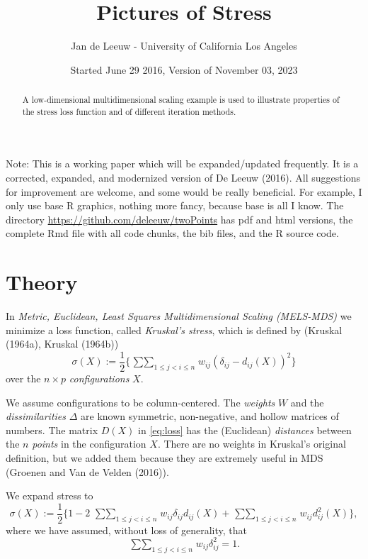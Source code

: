 \documentclass[
  12pt,
]{article}
\title{Pictures of Stress}
\author{Jan de Leeuw - University of California Los Angeles}
\date{Started June 29 2016, Version of November 03, 2023}
\newcommand{\jis}{\mathop{\sum\sum}_{1\leq j<i\leq n}}
\begin{document}
\maketitle
\begin{abstract}
A low-dimensional multidimensional scaling example is used to illustrate properties of the stress loss function and of different iteration methods.
\end{abstract}

{
\setcounter{tocdepth}{3}
\tableofcontents
}
Note: This is a working paper which will be expanded/updated frequently. It is a corrected, expanded, and modernized version of De Leeuw (2016). All suggestions for improvement are welcome, and some would be really beneficial. For example, I only use base R graphics, nothing more fancy, because base is all I know. The directory \url{https://github.com/deleeuw/twoPoints} has pdf and html versions, the complete Rmd file with all code chunks, the bib files, and the R source code.

\section{Theory}\label{theory}

In \emph{Metric, Euclidean, Least Squares Multidimensional Scaling (MELS-MDS)} we minimize a loss function, called \emph{Kruskal's stress}, which is defined by (Kruskal (1964a), Kruskal (1964b))
\begin{equation}
\sigma(X):=\frac12\{\jis w_{ij}(\delta_{ij}-d_{ij}(X))^2\}
\label{eq:loss}
\end{equation}
over the \(n\times p\) \emph{configurations} \(X\).

We assume configurations to be column-centered. The \emph{weights} \(W\) and the \emph{dissimilarities} \(\Delta\) are known symmetric, non-negative, and hollow matrices
of numbers. The matrix \(D(X)\) in \eqref{eq:loss} has the (Euclidean) \emph{distances} between the \(n\) \emph{points} in the configuration \(X\).
There are no weights in Kruskal's original definition, but we added them
because they are extremely useful in MDS (Groenen and Van de Velden (2016)).

We expand stress to
\begin{equation}
\sigma(X):=\frac12\{1 - 2\ \jis w_{ij}\delta_{ij}d_{ij}(X)+\jis w_{ij}d_{ij}^2(X)\},
\label{eq:lossexpand}
\end{equation}
where we have assumed, without loss of generality, that
\begin{equation}
\jis w_{ij}\delta_{ij}^2=1.
\label{eq:normdelta}
\end{equation}
\end{document}
